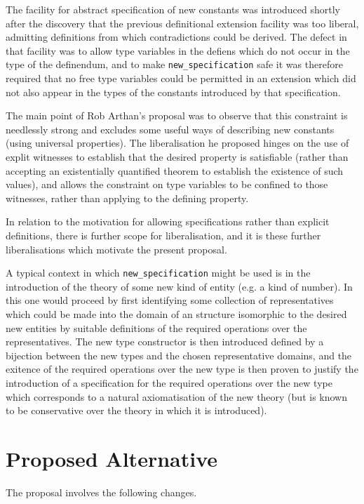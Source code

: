 \documentclass[12pt]{article}
\def\NewSpec{{\tt new\_specification}}
\begin{document}
The facility for abstract specification of new constants was introduced shortly after the discovery that the previous definitional extension facility was too liberal, admitting definitions from which contradictions could be derived.
The defect in that facility was to allow type variables in the defiens which do not occur in the type of the definendum, and to make {\NewSpec} safe it was therefore required that no free type variables could be permitted in an extension which did not also appear in the types of the constants introduced by that specification.

The main point of Rob Arthan's proposal was to observe that this constraint is needlessly strong and excludes some useful ways of describing new constants (using universal properties).
The liberalisation he proposed hinges on the use of explit witnesses to establish that the desired property is satisfiable (rather than accepting an existentially quantified theorem to establish the existence of such values), and allows the constraint on type variables to be confined to those witnesses, rather than applying to the defining property.

In relation to the motivation for allowing specifications rather than explicit definitions, there is further scope for liberalisation, and it is these further liberalisations which motivate the present proposal.

A typical context in which {\NewSpec} might be used is in the introduction of the theory of some new kind of entity (e.g. a kind of number).
In this one would proceed by first identifying some collection of representatives which could be made into the domain of an structure isomorphic to the desired new entities by suitable definitions of the required operations over the representatives.
The new type constructor is then introduced defined by a bijection between the new types and the chosen representative domains, and the exitence of the required operations over the new type is then proven to justify the introduction of a specification for the required operations over the new type which corresponds to a natural axiomatisation of the new theory (but is known to be conservative over the theory in which it is introduced).

\section{Proposed Alternative}

The proposal involves the following changes.
\end{document}
